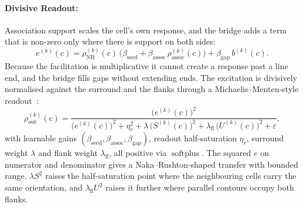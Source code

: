 \documentclass[11pt,a4paper]{article}
\newcommand{\softplus}{\operatorname{softplus}}
\begin{document}
\paragraph{Divisive Readout:}
Association support scales the cell's own response, and the bridge adds a term that is non-zero only where there is support on both sides:
\begin{equation}\label{eq:e}
  e^{(k)}(c) = \rho_{\mathrm{NR}}^{(k)}(c)\,\bigl(\beta_{\mathrm{seed}} + \beta_{\mathrm{assoc}}\, \rho_{\mathrm{assoc}}^{(k)}(c)\bigr) + \beta_{\mathrm{gap}}\, b^{(k)}(c).
\end{equation}
Because the facilitation is multiplicative it cannot create a response past a line end, and the bridge fills gaps without extending ends. The excitation is divisively normalised against the surround and the flanks through a Michaelis--Menten-style readout~\cite{naka1966srod,heeger1992normalisation}:
\begin{equation}\label{eq:rho-out-bin}
  \boxed{\;
  \rho_{\mathrm{out}}^{(k)}(c) = \frac{\bigl(e^{(k)}(c)\bigr)^2}
                                       {\bigl(e^{(k)}(c)\bigr)^2 + \eta_r^2 + \lambda\, \bigl(S^{(k)}(c)\bigr)^2 + \lambda_{\mathrm{fl}}\, \bigl(U^{(k)}(c)\bigr)^2 + \varepsilon},\;}
\end{equation}
with learnable gains $(\beta_{\mathrm{seed}}, \beta_{\mathrm{assoc}}, \beta_{\mathrm{gap}})$, readout half-saturation $\eta_r$, surround weight $\lambda$ and flank weight $\lambda_{\mathrm{fl}}$, all positive via $\softplus$. The squared $e$ on numerator and denominator gives a Naka--Rushton-shaped transfer with bounded range. $\lambda S^2$ raises the half-saturation point where the neighbouring cells carry the same orientation, and $\lambda_{\mathrm{fl}} U^2$ raises it further where parallel contours occupy both flanks.
\end{document}
